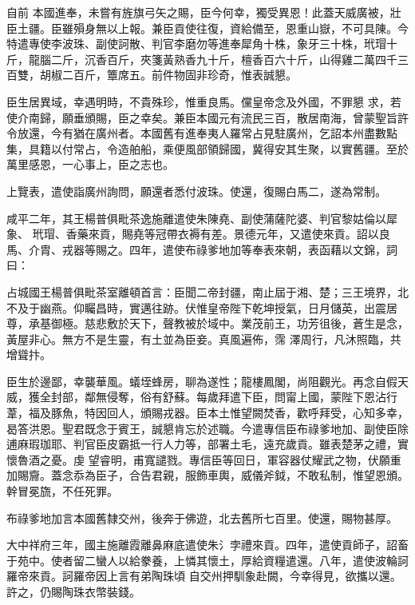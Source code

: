 \begin{pinyinscope}
 自前
 本國進奉，未嘗有旌旗弓矢之賜，臣今何幸，獨受異恩！此蓋天威廣被，壯臣土疆。臣雖殞身無以上報。兼臣貢使往復，資給備至，恩重山嶽，不可具陳。今特遣專使李波珠、副使訶散、判官李磨勿等進奉犀角十株，象牙三十株，玳瑁十斤，龍腦二斤，沉香百斤，夾箋黃熟香九十斤，檀香百六十斤，山得雞二萬四千三百雙，胡椒二百斤，簟席五。前件物固非珍奇，惟表誠懇。



 臣生居異域，幸遇明時，不貴殊珍，惟重良馬。儻皇帝念及外國，不罪懇
 求，若使介南歸，願垂頒賜，臣之幸矣。兼臣本國元有流民三百，散居南海，曾蒙聖旨許令放還，今有猶在廣州者。本國舊有進奉夷人羅常占見駐廣州，乞詔本州盡數點集，具籍以付常占，令造舶船，乘便風部領歸國，冀得安其生聚，以實舊疆。至於萬里感恩，一心事上，臣之志也。



 上覽表，遣使詣廣州詢問，願還者悉付波珠。使還，復賜白馬二，遂為常制。



 咸平二年，其王楊普俱毗茶逸施離遣使朱陳堯、副使蒲薩陀婆、判官黎姑倫以犀象、
 玳瑁、香藥來貢，賜堯等冠帶衣褥有差。景德元年，又遣使來貢。詔以良馬、介胄、戎器等賜之。四年，遣使布祿爹地加等奉表來朝，表函藉以文錦，詞曰：



 占城國王楊普俱毗茶室離頓首言：臣聞二帝封疆，南止屆于湘、楚；三王境界，北不及于幽燕。仰矚昌時，實邁往跡。伏惟皇帝陛下乾坤授氣，日月儲英，出震居尊，承基御極。慈悲敷於天下，聲教被於域中。業茂前王，功芳徂後，蒼生是念，黃屋非心。無方不是生靈，有土並為臣妾。真風遍佈，霈
 澤周行，凡沐照臨，共增聳抃。



 臣生於邊鄙，幸襲華風。蟻垤蜂房，聊為遂性；龍樓鳳閣，尚阻觀光。再念自假天威，獲全封部，鄰無侵奪，俗有舒蘇。每歲拜遣下臣，問甯上國，蒙陛下恩沾行葦，福及豚魚，特因回人，頒賜戎器。臣本土惟望闕焚香，歡呼拜受，心知多幸，曷答洪恩。聖君既念于賓王，誠懇肯忘於述職。今遣專信臣布祿爹地加、副使臣除逋麻瑕珈耶、判官臣皮霸抵一行人力等，部署土毛，遠充歲貢。雖表楚茅之禮，實懷魯酒之憂。虔
 望睿明，甫寬譴戮。專信臣等回日，軍容器仗耀武之物，伏願重加賜齎。蓋念忝為臣子，合告君親，服飾車輿，威儀斧鉞，不敢私制，惟望恩頒。幹冒冕旒，不任死罪。



 布祿爹地加言本國舊隸交州，後奔于佛遊，北去舊所七百里。使還，賜物甚厚。



 大中祥府三年，國主施離霞離鼻麻底遣使朱氵孛禮來貢。四年，遣使貢師子，詔畜于苑中。使者留二蠻人以給豢養，上憐其懷土，厚給資糧遣還。八年，遣使波輪訶羅帝來貢。訶羅帝因上言有弟陶珠頃
 自交州押馴象赴闕，今幸得見，欲攜以還。許之，仍賜陶珠衣幣裝錢。




\end{pinyinscope}
